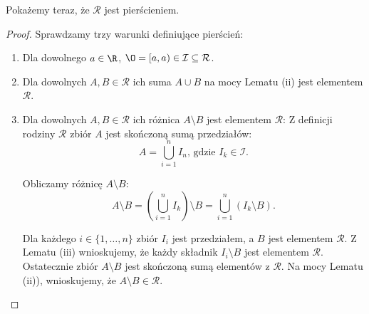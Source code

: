 \vspace{1em}

\noindent Pokażemy teraz, że $\mathcal{R}$ jest pierścieniem.
\begin{proof}
	Sprawdzamy trzy warunki definiujące pierścień:
	\begin{enumerate}[label=\alph*)]
		\item Dla dowolnego $a\in \R$, $\O = [a,a) \in \mathcal{I}\subseteq \mathcal{R}$.
	        \item Dla dowolnych $A,B \in \mathcal{R}$ ich suma $A\cup B$ na mocy Lematu (ii) jest elementem $\mathcal{R}$.
		\item Dla dowolnych $A,B \in \mathcal{R}$ ich różnica $A\setminus B$ jest elementem $\mathcal{R}$:
	Z definicji rodziny $\mathcal{R}$ zbiór $A$ jest skończoną sumą przedziałów:
\[
A = \bigcup_{i=1} ^{n}I_{n}\text{, gdzie } I_{k} \in \mathcal{I}
.\] 

Obliczamy różnicę $A\setminus B$:
\[
	A\setminus B = \left(\bigcup_{i=1} ^{n} I_{k}  \right) \setminus B = \bigcup_{i=1} ^{n}\left( I_{k}\setminus B \right)
.\] 

Dla każdego $i\in \{1,\ldots,n\} $ zbiór $I_{i}$ jest przedziałem, a  $B$ jest elementem $\mathcal{R}$. Z Lematu (iii) wnioskujemy, że każdy składnik $I_{i}\setminus B$ jest elementem $\mathcal{R}$.
Ostatecznie zbiór $A\setminus B$ jest skończoną sumą elementów z $\mathcal{R}$. Na mocy Lematu (ii)), wnioskujemy, że $A\setminus B \in \mathcal{R}.$
	\end{enumerate} 
\end{proof} 

\vspace{1em}

